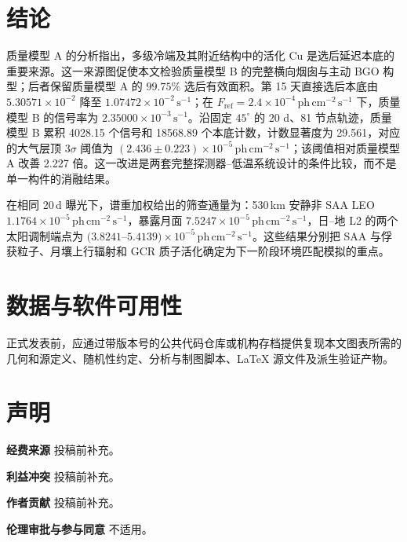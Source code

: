 \documentclass[11pt]{article}
\newcommand{\phcms}{\,\mathrm{ph\,cm^{-2}\,s^{-1}}}
\newcommand{\cps}{\,\mathrm{s^{-1}}}
\newcommand{\fref}{F_{\mathrm{ref}}}
\begin{document}
\section{结论}
\label{sec:conclusions}

质量模型 A 的分析指出，多级冷端及其附近结构中的活化 Cu 是选后延迟本底的重要来源。这一来源图促使本文检验质量模型 B 的完整横向烟囱与主动 BGO 构型；后者保留质量模型 A 的 $99.75\%$ 选后有效面积。第 15 天直接选后本底由 $5.30571\times10^{-2}$ 降至 $1.07472\times10^{-2}\cps$；在 $\fref=2.4\times10^{-4}\phcms$ 下，质量模型 B 的信号率为 $2.35000\times10^{-3}\cps$。沿固定 $45^\circ$ 的 20 d、81 节点轨迹，质量模型 B 累积 4028.15 个信号和 18568.89 个本底计数，计数显著度为 29.561，对应的大气层顶 $3\sigma$ 阈值为 $(2.436\pm0.223)\times10^{-5}\phcms$；该阈值相对质量模型 A 改善 2.227 倍。这一改进是两套完整探测器--低温系统设计的条件比较，而不是单一构件的消融结果。

在相同 20\,d 曝光下，谱重加权给出的筛查通量为：530\,km 安静非 SAA LEO $1.1764\times10^{-5}\phcms$，暴露月面 $7.5247\times10^{-5}\phcms$，日--地 L2 的两个太阳调制端点为 $(3.8241$--$5.4139)\times10^{-5}\phcms$。这些结果分别把 SAA 与俘获粒子、月壤上行辐射和 GCR 质子活化确定为下一阶段环境匹配模拟的重点。

\section*{数据与软件可用性}
正式发表前，应通过带版本号的公共代码仓库或机构存档提供复现本文图表所需的几何和源定义、随机性约定、分析与制图脚本、LaTeX 源文件及派生验证产物。

\section*{声明}
\textbf{经费来源} 投稿前补充。

\textbf{利益冲突} 投稿前补充。

\textbf{作者贡献} 投稿前补充。

\textbf{伦理审批与参与同意} 不适用。
\end{document}
